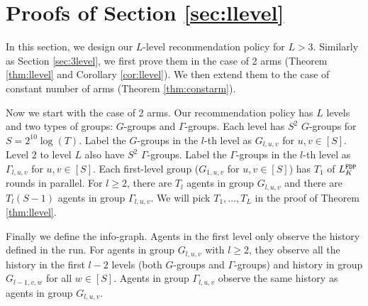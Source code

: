 
\section{Proofs of Section \ref{sec:llevel}}
\label{sec:llevel-details}
In this section, we design our $L$-level recommendation policy for $L > 3$. Similarly as Section \ref{sec:3level}, we first prove them in the case of 2 arms (Theorem \ref{thm:llevel} and Corollary \ref{cor:llevel}). We then extend them to the case of constant number of arms (Theorem \ref{thm:constarm}). 

Now we start with the case of 2 arms. Our recommendation policy has $L$ levels and two types of groups: $G$-groups and $\Gamma$-groups. Each level has $S^2$ $G$-groups for $S = 2^{10}\log(T)$. Label the $G$-groups in the $l$-th level as $G_{l,u,v}$ for $u,v \in [S]$. Level $2$ to level $L$ also have $S^2$ $\Gamma$-groups. Label the $\Gamma$-groups in the $l$-th level as $\Gamma_{l,u,v}$ for $u,v \in [S]$. Each first-level group ($G_{1,u,v}$ for $u,v\in [S]$) has $T_1$ \ALGG of $L^\mathtt{FDP}_K$ rounds in parallel. For $l \geq 2$, there are $T_l$ agents in group $G_{l,u,v}$ and there are $T_l (S-1)$ agents in group $\Gamma_{l,u,v}$. We will pick $T_1,...,T_L$ in the proof of Theorem \ref{thm:llevel}.

Finally we define the info-graph. Agents in the first level only observe the history defined in the \ALGG run. For agents in group $G_{l,u,v}$ with $l\geq 2$, they observe all the history in the first $l-2$ levels (both $G$-groups and $\Gamma$-groups) and history in group $G_{l-1,v,w}$ for all $w \in [S]$. Agents in group $\Gamma_{l,u,v}$ observe the same history as agents in group $G_{l,u,v}$.
 
